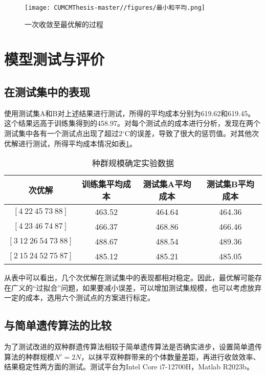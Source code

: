 \documentclass[withoutpreface,bwprint]{cumcmthesis} %
\begin{document}
\begin{figure}[htbp]
    \centering
    \texttt{[image: CUMCMThesis-master//figures/最小和平均.png]}
    \caption{一次收敛至最优解的过程}
    \label{fig:minavg}
\end{figure}

\section{模型测试与评价}

\subsection{在测试集中的表现}
\label{sec:test}

使用测试集A和B对上述结果进行测试，所得的平均成本分别为619.62和619.45。这个结果远高于训练集得到的458.97。对每个测试点的成本进行分析，发现在两个测试集中各有一个测试点出现了超过2$^{\circ} \mathrm C$的误差，导致了很大的惩罚值。对其他次优解进行测试，所得平均成本情况如表\ref{tab:test}。

\begin{table}[htbp]
    \centering
    \caption{种群规模确定实验数据}
    \begin{tabular}{cccc}
    \toprule
        次优解 & 训练集平均成本 & 测试集A平均成本 & 测试集B平均成本 \\
    \midrule
        $[4\ 22\ 45\ 73\ 88]$ & 463.52 & 464.64 & 464.36\\
        $[4\ 23\ 46\ 74\ 87]$ & 466.37 & 468.86 & 466.46\\
        $[3\ 12\ 26\ 54\ 73\ 88]$ & 488.67 & 488.54 & 489.36\\
        $[2\ 15\ 24\ 52\ 75\ 87]$ & 485.12 & 485.21 & 485.05\\
    \bottomrule
    \end{tabular}
    \label{tab:test}
\end{table}

从表中可以看出，几个次优解在测试集中的表现都相对稳定。因此，最优解可能存在广义的“过拟合”问题，如果要减小误差，可以增加测试集规模，也可以考虑放弃一定的成本，选用六个测试点的方案进行标定。

\subsection{与简单遗传算法的比较}

为了测试改进的双种群遗传算法相较于简单遗传算法是否确实进步，设置简单遗传算法的种群规模$N'=2N$，以抹平双种群带来的个体数量差距，再进行收敛效率、结果稳定性两方面的测试。测试平台为Intel Core i7-12700H，Matlab R2023b。
\end{document}
